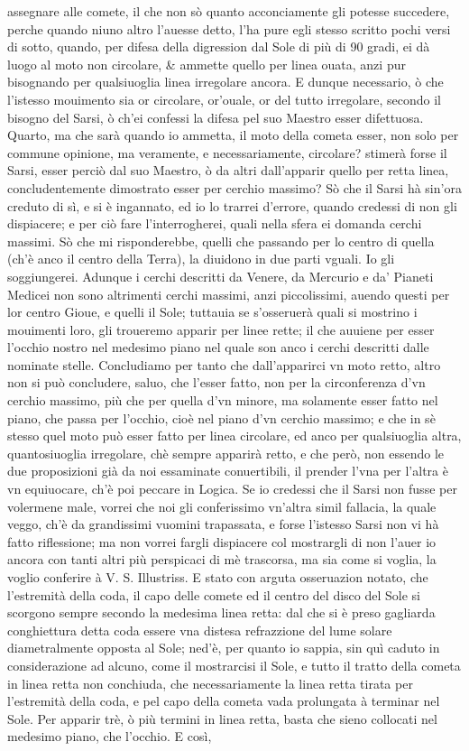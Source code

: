 \documentclass[11pt,twoside,openany]{book}
\begin{document}
assegnare alle comete, il che non sò quanto acconciamente gli potesse succedere, perche quando niuno altro l'auesse detto, l'ha pure egli stesso scritto pochi versi di sotto, quando, per difesa della digression dal Sole di più di 90 gradi, ei dà luogo al moto non circolare, \& ammette quello per linea ouata, anzi pur bisognando per qualsiuoglia linea irregolare ancora. E dunque necessario, ò che l'istesso mouimento sia or circolare, or'ouale, or del tutto irregolare, secondo il bisogno del Sarsi, ò ch'ei confessi la difesa pel suo Maestro esser difettuosa. Quarto, ma che sarà quando io ammetta, il moto della cometa esser, non solo per commune opinione, ma veramente, e necessariamente, circolare? stimerà forse il Sarsi, esser perciò dal suo Maestro, ò da altri dall'apparir quello per retta linea, concludentemente dimostrato esser per cerchio massimo? Sò che il Sarsi hà sin'ora creduto di sì, e si è ingannato, ed io lo trarrei d'errore, quando credessi di non gli dispiacere; e per ciò fare l'interrogherei, quali nella sfera ei domanda cerchi massimi. Sò che mi risponderebbe, quelli che passando per lo centro di quella (ch'è anco il centro della Terra), la diuidono in due parti vguali. Io gli soggiungerei. Adunque i cerchi descritti da Venere, da Mercurio e da' Pianeti Medicei non sono altrimenti cerchi massimi, anzi piccolissimi, auendo questi per lor centro Gioue, e quelli il Sole; tuttauia se s'osseruerà quali si mostrino i mouimenti loro, gli troueremo apparir per linee rette; il che auuiene per esser l'occhio nostro nel medesimo piano nel quale son anco i cerchi descritti dalle nominate stelle. Concludiamo per tanto che dall'apparirci vn moto retto, altro non si può concludere, saluo, che l'esser fatto, non per la circonferenza d'vn cerchio massimo, più che per quella d'vn minore, ma solamente esser fatto nel piano, che passa per l'occhio, cioè nel piano d'vn cerchio massimo; e che in sè stesso quel moto può esser fatto per linea circolare, ed anco per qualsiuoglia altra, quantosiuoglia irregolare, chè sempre apparirà retto, e che però, non essendo le due proposizioni già da noi essaminate conuertibili, il prender l'vna per l'altra è vn equiuocare, ch'è poi peccare in Logica. Se io credessi che il Sarsi non fusse per volermene male, vorrei che noi gli conferissimo vn'altra simil fallacia, la quale veggo, ch'è da grandissimi vuomini trapassata, e forse l'istesso Sarsi non vi hà fatto riflessione; ma non vorrei fargli dispiacere col mostrargli di non l'auer io ancora con tanti altri più perspicaci di mè trascorsa, ma sia come si voglia, la voglio conferire à V. S. Illustriss. E stato con arguta osseruazion notato, che l'estremità della coda, il capo delle comete ed il centro del disco del Sole si scorgono sempre secondo la medesima linea retta: dal che si è preso gagliarda conghiettura detta coda essere vna distesa refrazzione del lume solare diametralmente opposta al Sole; ned'è, per quanto io sappia, sin quì caduto in considerazione ad alcuno, come il mostrarcisi il Sole, e tutto il tratto della cometa in linea retta non conchiuda, che necessariamente la linea retta tirata per l'estremità della coda, e pel capo della cometa vada prolungata à terminar nel Sole. Per apparir trè, ò più termini in linea retta, basta che sieno collocati nel medesimo piano, che l'occhio. E così, 
\end{document}
